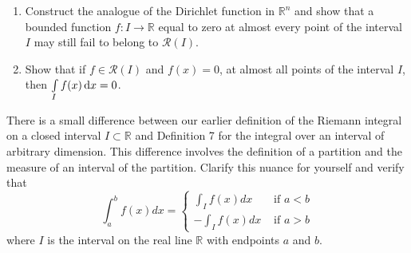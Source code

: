 \documentclass{Math_Note}
\begin{document}
\newpage
\begin{prb}
\begin{enumerate}
  \item [a)] Construct the analogue of the Dirichlet function in $\mathbb{R}^{n}$ and show that a bounded function $f:I\to\mathbb{R}$ equal to zero at almost every point of the interval $I$ may still fail to belong to $\mathcal{R}(I)$.
  \item [b)] Show that if $f\in\mathcal{R}(I)$ and $f(x)=0$, at almost all points of the interval $I$, then $\int\limits_{I}f(x)\,{\rm d}x=0$.
\end{enumerate}
\end{prb}
\begin{prb}
There is a small difference between our earlier definition of the Riemann integral on a closed interval $I \subset \mathbb{R}$ and Definition 7 for the integral over an interval of arbitrary dimension. This difference involves the definition of a partition and the measure of an interval of the partition. Clarify this nuance for yourself and verify that
$$\int_a^b f(x) dx = \begin{cases} \int_I f(x) dx & \text{ if } a < b \\ - \int_I f(x) dx & \text{ if } a > b \end{cases}$$
where $I$ is the interval on the real line $\mathbb{R}$ with endpoints $a$ and $b$.
\end{prb}
\end{document}
